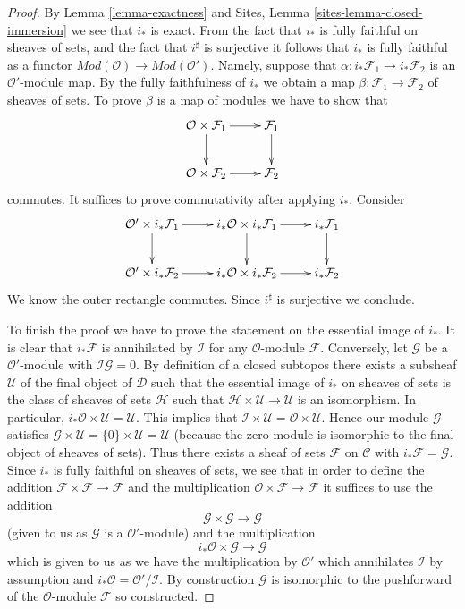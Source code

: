 \begin{proof}
By Lemma \ref{lemma-exactness} and
Sites, Lemma \ref{sites-lemma-closed-immersion}
we see that $i_*$ is exact. From the fact that
$i_*$ is fully faithful on sheaves of sets, and the fact that
$i^\sharp$ is surjective it follows that $i_*$ is fully faithful
as a functor $\textit{Mod}(\mathcal{O}) \to \textit{Mod}(\mathcal{O}')$.
Namely, suppose that $\alpha : i_*\mathcal{F}_1 \to i_*\mathcal{F}_2$
is an $\mathcal{O}'$-module map. By the fully faithfulness of $i_*$
we obtain a map $\beta : \mathcal{F}_1 \to \mathcal{F}_2$ of sheaves
of sets. To prove $\beta$ is a map of modules we have to show
that
$$
\xymatrix{
\mathcal{O} \times \mathcal{F}_1 \ar[r] \ar[d] &
\mathcal{F}_1 \ar[d] \\
\mathcal{O} \times \mathcal{F}_2 \ar[r] &
\mathcal{F}_2
}
$$
commutes. It suffices to prove commutativity after applying $i_*$.
Consider
$$
\xymatrix{
\mathcal{O}' \times i_*\mathcal{F}_1 \ar[r] \ar[d] &
i_*\mathcal{O} \times i_*\mathcal{F}_1 \ar[r] \ar[d] &
i_*\mathcal{F}_1 \ar[d] \\
\mathcal{O}' \times i_*\mathcal{F}_2 \ar[r] &
i_*\mathcal{O} \times i_*\mathcal{F}_2 \ar[r] &
i_*\mathcal{F}_2
}
$$
We know the outer rectangle commutes. Since $i^\sharp$ is surjective
we conclude.

\medskip\noindent
To finish the proof we have to prove the statement on the essential
image of $i_*$. It is clear that $i_*\mathcal{F}$ is annihilated by
$\mathcal{I}$ for any $\mathcal{O}$-module $\mathcal{F}$. Conversely,
let $\mathcal{G}$ be a $\mathcal{O}'$-module with
$\mathcal{I}\mathcal{G} = 0$. By definition of a closed subtopos
there exists a subsheaf $\mathcal{U}$ of the final object of
$\mathcal{D}$ such that the essential image of $i_*$ on sheaves of sets
is the class of sheaves of sets $\mathcal{H}$ such that
$\mathcal{H} \times \mathcal{U} \to \mathcal{U}$ is an isomorphism.
In particular, $i_*\mathcal{O} \times \mathcal{U} = \mathcal{U}$.
This implies that
$\mathcal{I} \times \mathcal{U} = \mathcal{O} \times \mathcal{U}$.
Hence our module $\mathcal{G}$ satisfies
$\mathcal{G} \times \mathcal{U} = \{0\} \times \mathcal{U} = \mathcal{U}$
(because the zero module is isomorphic to the final object of sheaves
of sets). Thus there exists a sheaf of sets $\mathcal{F}$ on $\mathcal{C}$
with $i_*\mathcal{F} = \mathcal{G}$. Since $i_*$ is fully faithful on sheaves
of sets, we see that in order to define the
addition $\mathcal{F} \times \mathcal{F} \to \mathcal{F}$ and the
multiplication $\mathcal{O} \times \mathcal{F} \to \mathcal{F}$
it suffices to use the addition
$$
\mathcal{G} \times \mathcal{G} \longrightarrow \mathcal{G}
$$
(given to us as $\mathcal{G}$ is a $\mathcal{O}'$-module)
and the multiplication
$$
i_*\mathcal{O} \times \mathcal{G} \to \mathcal{G}
$$
which is given to us as we have the multiplication by
$\mathcal{O}'$ which annihilates $\mathcal{I}$ by assumption
and $i_*\mathcal{O} = \mathcal{O}'/\mathcal{I}$. By construction
$\mathcal{G}$ is isomorphic to the pushforward of the $\mathcal{O}$-module
$\mathcal{F}$ so constructed.
\end{proof}
